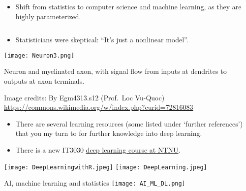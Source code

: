 \documentclass[
  10pt,
  ignorenonframetext,
]{beamer}
\providecommand{\tightlist}{%
  \setlength{\itemsep}{0pt}\setlength{\parskip}{0pt}}
\begin{document}
\begin{frame}
\begin{itemize}
\tightlist
\item
  Shift from statistics to computer science and machine learning, as
  they are highly parameterized.
\end{itemize}

\(~\)

\begin{itemize}
\tightlist
\item
  Statisticians were skeptical: ``It's just a nonlinear model''.
\end{itemize}
\end{frame}

\begin{frame}
\centering

\texttt{[image: Neuron3.png]}

\flushleft

Neuron and myelinated axon, with signal flow from inputs at dendrites to
outputs at axon terminals.

\scriptsize

Image credits: By Egm4313.s12 (Prof.~Loc Vu-Quoc)
\url{https://commons.wikimedia.org/w/index.php?curid=72816083}
\end{frame}

\begin{frame}
\begin{itemize}
\tightlist
\item
  There are several learning resources (some listed under `further
  references') that you my turn to for further knowledge into deep
  learning.
\item
  There is a new IT3030
  \href{https://www.ntnu.no/studier/emner/IT3030\#tab=omEmnet}{deep
  learning course at NTNU}.
\end{itemize}

\centering

\texttt{[image: DeepLearningwithR.jpeg]}
\texttt{[image: DeepLearning.jpeg]}
\end{frame}

\begin{frame}
\begin{block}{AI, machine learning and statistics}
\protect\hypertarget{ai-machine-learning-and-statistics}{}
\texttt{[image: AI\_ML\_DL.png]}
\end{block}
\end{frame}
\end{document}
